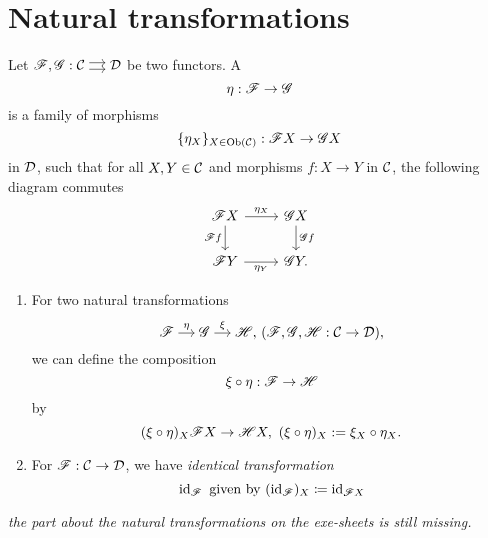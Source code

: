 \section{Natural transformations}
\begin{defn}
Let $\ffunc,\gfunc :\begin{tikzcd}[cramped, sep=small] \ccat\ar[shift left]{r}\ar[shift right]{r}&\dcat\end{tikzcd}$ be two functors. A 
\[
\eta:\mathscr{F}\to\mathscr{G}\]
is a family of morphisms
\[
\{\eta_X\}_{X\in \text{Ob}(\mathcal{C})}:\mathscr{F} X\to \mathscr{G} X\]
in $\mathcal{D}$, such that for all $X,Y\in \mathcal{C}$ and morphisms $f:X\to Y$ in $\mathcal{C}$, the following diagram commutes
\[
\begin{tikzcd}
  \ffunc X\ar{r}{\eta_X}\ar[swap]{d}{\ffunc f}&\gfunc X\ar{d}{\gfunc f}\\
  \ffunc Y\ar[swap]{r}{\eta_Y}&\gfunc Y.
\end{tikzcd}
\]
\end{defn}
\begin{rem}
  \begin{enumerate}
  \item For two natural transformations
  \[
  \begin{tikzcd}[cramped, sep = small]
    \ffunc\ar{r}{\eta}&\gfunc\ar{r}{\xi}&\fcr{H},
  \end{tikzcd}~(\ffunc,\gfunc,\hfunc:\ccat\to \dcat),
  \]
  we can define the composition
  \[
    \xi \circ \eta: \mathscr{F} \to \mathscr{H}
  \] by
  \[
  (\xi\circ \eta)_X\mathscr{F} X\to \mathscr{H} X,~(\xi\circ \eta)_X:= \xi_X\circ \eta_X.
  \]
  \item For $\mathscr{F}: \mathcal{C}\to \mathcal{D}$, we have \emph{identical transformation}
  \[
  \operatorname{id}_{\mathscr{F}}\text{ given by }(\operatorname{id}_{\mathscr{F}})_X\coloneqq\operatorname{id}_{\mathscr{F} X}
  \]
\end{enumerate}
\end{rem}
\coms \textit{the part about the natural transformations on the exe-sheets is still missing.}\come


\lec
